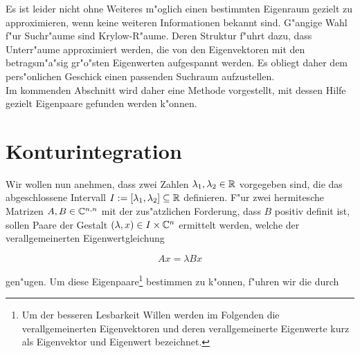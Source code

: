 
Es ist leider nicht ohne Weiteres m"oglich einen bestimmten Eigenraum gezielt
zu approximieren, wenn keine weiteren Informationen bekannt sind. G"angige
Wahl f"ur Suchr"aume sind Krylow-R"aume. Deren Struktur f"uhrt dazu, dass
Unterr"aume approximiert werden, die von den Eigenvektoren mit den betragsm"a"sig
gr"o"sten Eigenwerten aufgespannt werden. Es obliegt daher dem pers"onlichen
Geschick einen passenden Suchraum aufzustellen.\\

Im kommenden Abschnitt wird daher eine Methode vorgestellt, mit dessen Hilfe gezielt
Eigenpaare gefunden werden k"onnen.

\section{Konturintegration}

Wir wollen nun anehmen, dass zwei Zahlen $\lambda_1, \lambda_2 \in \mathbb{R}$ vorgegeben sind, die
das abgeschlossene Intervall $I:=[\lambda_1, \lambda_2] \subseteq \mathbb{R}$ definieren.
F"ur zwei hermitesche Matrizen $A, B \in \mathbb{C}^{n,n}$ mit der zus"atzlichen
Forderung, dass $B$ positiv definit ist, sollen Paare der Gestalt
$(\lambda, x) \in I \times \mathbb{C}^n$ ermittelt werden, welche der verallgemeinerten
Eigenwertgleichung

  \begin{equation}\label{eq:eigen} %
  Ax = \lambda Bx
  \end{equation}

gen"ugen. Um diese Eigenpaare\footnote{Um der besseren Lesbarkeit Willen werden
im Folgenden die verallgemeinerten Eigenvektoren und deren verallgemeinerte
Eigenwerte kurz als Eigenvektor und Eigenwert bezeichnet.}
bestimmen zu k"onnen, f"uhren wir die durch%



